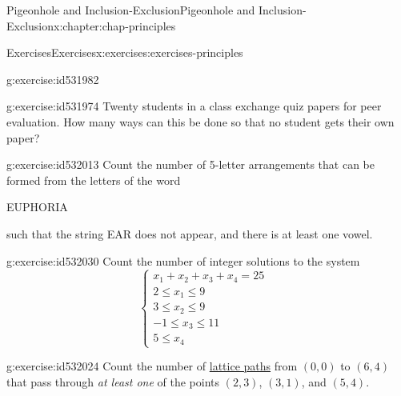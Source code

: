 \documentclass[oneside,10pt,]{book}
\numberwithin{equation}{section}
\newcommand{\amp}{&}
\begin{document}
\begin{chapterptx}{Pigeonhole and Inclusion-Exclusion}{}{Pigeonhole and Inclusion-Exclusion}{}{}{x:chapter:chap-principles}
\begin{exercises-section}{Exercises}{}{Exercises}{}{}{x:exercises:exercises-principles}
\begin{divisionexercise}{12}{}{}{g:exercise:id531982}
\end{divisionexercise}%
\begin{divisionexercise}{13}{}{}{g:exercise:id531974}%
Twenty students in a class exchange quiz papers for peer evaluation. How many ways can this be done so that no student gets their own paper?%
\end{divisionexercise}%
\begin{divisionexercise}{14}{}{}{g:exercise:id532013}%
Count the number of 5-letter arrangements that can be formed from the letters of the word%
\begin{sidebyside}{1}{0.375}{0.375}{0}%
\begin{sbspanel}{0.25}%
EUPHORIA%
\end{sbspanel}%
\end{sidebyside}%
\par
such that the string EAR does not appear, and there is at least one vowel.%
\end{divisionexercise}%
\begin{divisionexercise}{15}{}{}{g:exercise:id532030}%
Count the number of integer solutions to the system%
\begin{equation*}
\begin{cases} x_1 + x_2 + x_3 + x_4 = 25 \amp \\ 
2 \leq x_1 \leq 9 \amp \\
3 \leq x_2 \leq 9 \amp \\
-1 \leq x_3 \leq 11 \amp \\
5 \leq x_4 \ \ \amp \end{cases}
\end{equation*}
%
\end{divisionexercise}%
\begin{divisionexercise}{16}{}{}{g:exercise:id532024}%
Count the number of \hyperref[x:example:eg-counting-lattice-path]{lattice paths} from \((0,0)\) to \((6,4)\) that pass through \emph{at least one} of the points \((2,3)\), \((3,1)\), and \((5,4)\).%
\begin{sidebyside}{1}{0.3}{0.3}{0}%
\begin{sbspanel}{0.4}%
\end{sbspanel}
\end{sidebyside}
\end{divisionexercise}
\end{exercises-section}
\end{chapterptx}
\end{document}
